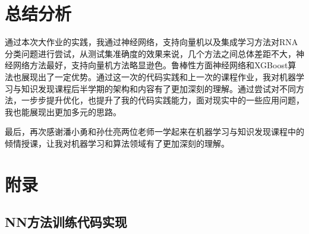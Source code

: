 \documentclass[a4paper,11pt,AutoFakeBold]{ctexart}
\begin{document}
\section{总结分析}
通过本次大作业的实践，我通过神经网络，支持向量机以及集成学习方法对RNA分类问题进行尝试，从测试集准确度的效果来说，几个方法之间总体差距不大，神经网络方法最好，支持向量机方法略显逊色。鲁棒性方面神经网络和XGBoost算法也展现出了一定优势。通过这一次的代码实践和上一次的课程作业，我对机器学习与知识发现课程后半学期的架构和内容有了更加深刻的理解。通过尝试对不同方法，一步步提升优化，也提升了我的代码实践能力，面对现实中的一些应用问题，我也能展现出更加多元的思路。

最后，再次感谢潘小勇和孙仕亮两位老师一学起来在机器学习与知识发现课程中的倾情授课，让我对机器学习和算法领域有了更加深刻的理解。




\section{附录}

\subsection{NN方法训练代码实现}
\end{document}
